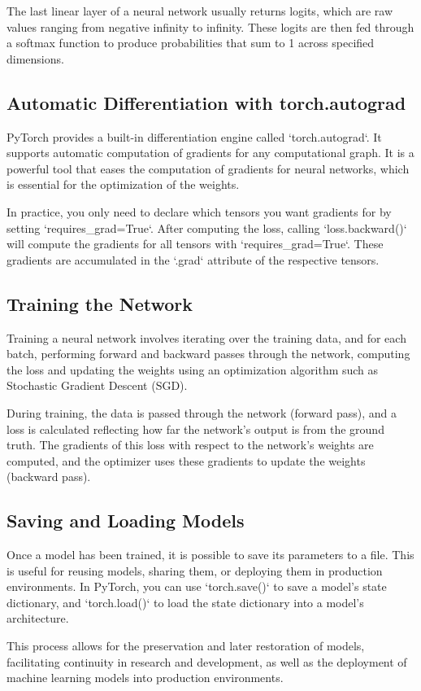 The last linear layer of a neural network usually returns logits, which are raw values ranging from negative infinity to infinity. These logits are then fed through a softmax function to produce probabilities that sum to 1 across specified dimensions.

\subsection{Automatic Differentiation with torch.autograd}

PyTorch provides a built-in differentiation engine called `torch.autograd`. It supports automatic computation of gradients for any computational graph. It is a powerful tool that eases the computation of gradients for neural networks, which is essential for the optimization of the weights.

In practice, you only need to declare which tensors you want gradients for by setting `requires\_grad=True`. After computing the loss, calling `loss.backward()` will compute the gradients for all tensors with `requires\_grad=True`. These gradients are accumulated in the `.grad` attribute of the respective tensors.

\subsection{Training the Network}

Training a neural network involves iterating over the training data, and for each batch, performing forward and backward passes through the network, computing the loss and updating the weights using an optimization algorithm such as Stochastic Gradient Descent (SGD).

During training, the data is passed through the network (forward pass), and a loss is calculated reflecting how far the network's output is from the ground truth. The gradients of this loss with respect to the network's weights are computed, and the optimizer uses these gradients to update the weights (backward pass).

\subsection{Saving and Loading Models}

Once a model has been trained, it is possible to save its parameters to a file. This is useful for reusing models, sharing them, or deploying them in production environments. In PyTorch, you can use `torch.save()` to save a model's state dictionary, and `torch.load()` to load the state dictionary into a model's architecture.

This process allows for the preservation and later restoration of models, facilitating continuity in research and development, as well as the deployment of machine learning models into production environments.
